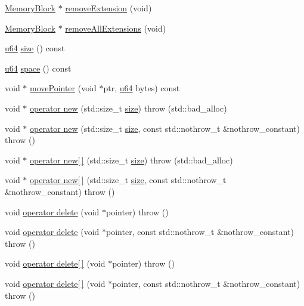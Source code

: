 \begin{DoxyCompactItemize}
\item 
\hyperlink{classcrap_1_1memory_1_1_memory_block}{Memory\-Block} $\ast$ \hyperlink{classcrap_1_1memory_1_1_memory_block_a7880dc6dae2620c75a851274f04faf63}{remove\-Extension} (void)
\item 
\hyperlink{classcrap_1_1memory_1_1_memory_block}{Memory\-Block} $\ast$ \hyperlink{classcrap_1_1memory_1_1_memory_block_a1a0cfd1024d6789d633e5c1f4231e78c}{remove\-All\-Extensions} (void)
\item 
\hyperlink{types_8h_a3f7e2bcbb0b4c338f3c4f6c937cd4234}{u64} \hyperlink{classcrap_1_1memory_1_1_memory_block_af49c6e39cc758374608ddefc66208c24}{size} () const 
\item 
\hyperlink{types_8h_a3f7e2bcbb0b4c338f3c4f6c937cd4234}{u64} \hyperlink{classcrap_1_1memory_1_1_memory_block_a195c1960e05e5d3623435626550709fb}{space} () const 
\item 
void $\ast$ \hyperlink{classcrap_1_1memory_1_1_memory_block_ad6d8bf1c4af084ca7d76cc0f23c391b9}{move\-Pointer} (void $\ast$ptr, \hyperlink{types_8h_a3f7e2bcbb0b4c338f3c4f6c937cd4234}{u64} bytes) const 
\item 
void $\ast$ \hyperlink{classcrap_1_1memory_1_1_memory_block_af3f2847441101b18a9b1bc6aafe318a0}{operator new} (std\-::size\-\_\-t \hyperlink{classcrap_1_1memory_1_1_memory_block_af49c6e39cc758374608ddefc66208c24}{size})  throw (std\-::bad\-\_\-alloc)
\item 
void $\ast$ \hyperlink{classcrap_1_1memory_1_1_memory_block_a27eb3b0435e7c3a5c6ad9c57df90eefe}{operator new} (std\-::size\-\_\-t \hyperlink{classcrap_1_1memory_1_1_memory_block_af49c6e39cc758374608ddefc66208c24}{size}, const std\-::nothrow\-\_\-t \&nothrow\-\_\-constant)  throw ()
\item 
void $\ast$ \hyperlink{classcrap_1_1memory_1_1_memory_block_a3f8636abd700910bb7186d000c5f1185}{operator new\mbox{[}$\,$\mbox{]}} (std\-::size\-\_\-t \hyperlink{classcrap_1_1memory_1_1_memory_block_af49c6e39cc758374608ddefc66208c24}{size})  throw (std\-::bad\-\_\-alloc)
\item 
void $\ast$ \hyperlink{classcrap_1_1memory_1_1_memory_block_ab3298feac13b4acaa9bc628e08c97e24}{operator new\mbox{[}$\,$\mbox{]}} (std\-::size\-\_\-t \hyperlink{classcrap_1_1memory_1_1_memory_block_af49c6e39cc758374608ddefc66208c24}{size}, const std\-::nothrow\-\_\-t \&nothrow\-\_\-constant)  throw ()
\item 
void \hyperlink{classcrap_1_1memory_1_1_memory_block_a394c8189d766eaef8b29e129b8f4a651}{operator delete} (void $\ast$pointer)  throw ()
\item 
void \hyperlink{classcrap_1_1memory_1_1_memory_block_a53d0a64ace86ad3021d7b3efe6caf1ba}{operator delete} (void $\ast$pointer, const std\-::nothrow\-\_\-t \&nothrow\-\_\-constant)  throw ()
\item 
void \hyperlink{classcrap_1_1memory_1_1_memory_block_a89cfe3bcb331313161c3844e69bc72e9}{operator delete\mbox{[}$\,$\mbox{]}} (void $\ast$pointer)  throw ()
\item 
void \hyperlink{classcrap_1_1memory_1_1_memory_block_af8a64add3ee889dfc14399ade349218e}{operator delete\mbox{[}$\,$\mbox{]}} (void $\ast$pointer, const std\-::nothrow\-\_\-t \&nothrow\-\_\-constant)  throw ()
\end{DoxyCompactItemize}
